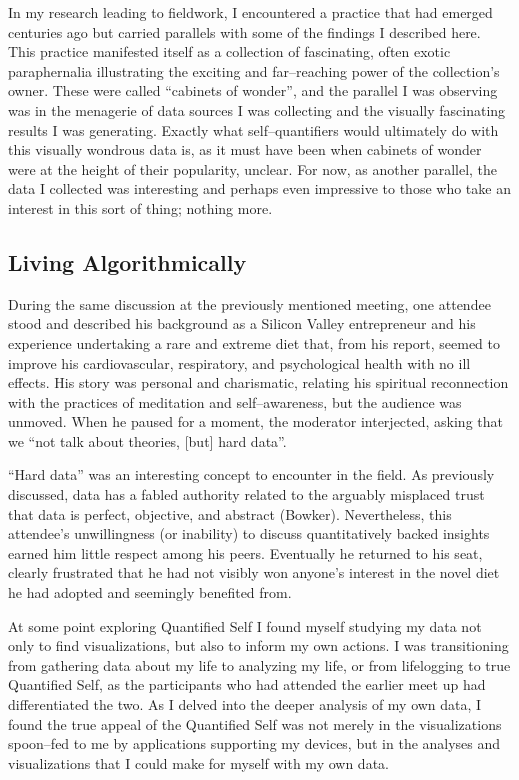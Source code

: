 \documentclass{article}
\begin{document}
In my research leading to fieldwork,
I encountered a practice that had emerged centuries ago but carried parallels with some of the findings I described here.
This practice manifested itself as a collection of fascinating,
often exotic paraphernalia illustrating the exciting and far--reaching power of the collection's owner.
These were called ``cabinets of wonder'',
and the parallel I was observing was in the menagerie of data sources I was collecting and the visually fascinating results I was generating.
Exactly what self--quantifiers would ultimately do with this visually wondrous data is,
as it must have been when cabinets of wonder were at the height of their popularity,
unclear.
For now,
as another parallel,
the data I collected was interesting and perhaps even impressive to those who take an interest in this sort of thing;
nothing more.

\subsection*{Living Algorithmically}
During the same discussion at the previously mentioned meeting,
one attendee stood and described his background as a Silicon Valley entrepreneur and his experience undertaking a rare and extreme diet that,
from his report,
seemed to improve his cardiovascular,
respiratory,
and psychological health with no ill effects.
His story was personal and charismatic,
relating his spiritual reconnection with the practices of meditation and self--awareness,
but the audience was unmoved.
When he paused for a moment,
the moderator interjected,
asking that we ``not talk about theories,
[but] hard data''.

``Hard data'' was an interesting concept to encounter in the field.
As previously discussed,
data has a fabled authority related to the arguably misplaced trust that data is perfect,
objective,
and abstract
(Bowker).
Nevertheless,
this attendee's unwillingness (or inability) to discuss quantitatively backed insights earned him little respect among his peers.
Eventually he returned to his seat,
clearly frustrated that he had not visibly won anyone's interest in the novel diet he had adopted and seemingly benefited from.

At some point exploring Quantified Self I found myself studying my data not only to find visualizations,
but also to inform my own actions.
I was transitioning from gathering data about my life to analyzing my life,
or from lifelogging to true Quantified Self,
as the participants who had attended the earlier meet up had differentiated the two.
As I delved into the deeper analysis of my own data,
I found the true appeal of the Quantified Self was not merely in the visualizations spoon--fed to me by applications supporting my devices,
but in the analyses and visualizations that I could make for myself with my own data.
\end{document}
